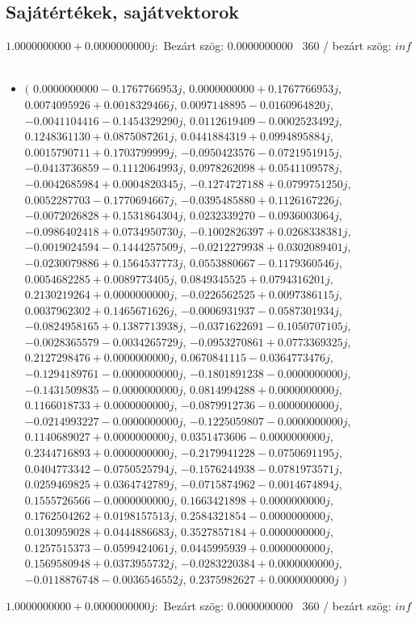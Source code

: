 \documentclass[14pt,a4paper]{article}
\begin{document}
\subsection{Sajátértékek, sajátvektorok}
$1.0000000000+0.0000000000j$:\
Bezárt szög: $0.0000000000$ \
360 / bezárt szög: $inf$\
\begin{itemize}
\item
$\big($
$0.0000000000-0.1767766953j$, $0.0000000000+0.1767766953j$, $0.0074095926+0.0018329466j$, $0.0097148895-0.0160964820j$, $-0.0041104416-0.1454329290j$, $0.0112619409-0.0002523492j$, $0.1248361130+0.0875087261j$, $0.0441884319+0.0994895884j$, $0.0015790711+0.1703799999j$, $-0.0950423576-0.0721951915j$, $-0.0413736859-0.1112064993j$, $0.0978262098+0.0541109578j$, $-0.0042685984+0.0004820345j$, $-0.1274727188+0.0799751250j$, $0.0052287703-0.1770694667j$, $-0.0395485880+0.1126167226j$, $-0.0072026828+0.1531864304j$, $0.0232339270-0.0936003064j$, $-0.0986402418+0.0734950730j$, $-0.1002826397+0.0268338381j$, $-0.0019024594-0.1444257509j$, $-0.0212279938+0.0302089401j$, $-0.0230079886+0.1564537773j$, $0.0553880667-0.1179360546j$, $0.0054682285+0.0089773405j$, $0.0849345525+0.0794316201j$, $0.2130219264+0.0000000000j$, $-0.0226562525+0.0097386115j$, $0.0037962302+0.1465671626j$, $-0.0006931937-0.0587301934j$, $-0.0824958165+0.1387713938j$, $-0.0371622691-0.1050707105j$, $-0.0028365579-0.0034265729j$, $-0.0953270861+0.0773369325j$, $0.2127298476+0.0000000000j$, $0.0670841115-0.0364773476j$, $-0.1294189761-0.0000000000j$, $-0.1801891238-0.0000000000j$, $-0.1431509835-0.0000000000j$, $0.0814994288+0.0000000000j$, $0.1166018733+0.0000000000j$, $-0.0879912736-0.0000000000j$, $-0.0214993227-0.0000000000j$, $-0.1225059807-0.0000000000j$, $0.1140689027+0.0000000000j$, $0.0351473606-0.0000000000j$, $0.2344716893+0.0000000000j$, $-0.2179941228-0.0750691195j$, $0.0404773342-0.0750525794j$, $-0.1576244938-0.0781973571j$, $0.0259469825+0.0364742789j$, $-0.0715874962-0.0014674894j$, $0.1555726566-0.0000000000j$, $0.1663421898+0.0000000000j$, $0.1762504262+0.0198157513j$, $0.2584321854-0.0000000000j$, $0.0130959028+0.0444886683j$, $0.3527857184+0.0000000000j$, $0.1257515373-0.0599424061j$, $0.0445995939+0.0000000000j$, $0.1569580948+0.0373955732j$, $-0.0283220384+0.0000000000j$, $-0.0118876748-0.0036546552j$, $0.2375982627+0.0000000000j$
$\big)$
\end{itemize}
$1.0000000000+0.0000000000j$:\
Bezárt szög: $0.0000000000$ \
360 / bezárt szög: $inf$\
\end{document}
